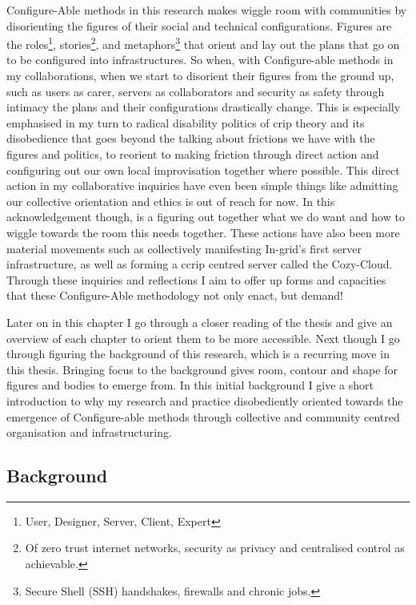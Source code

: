 Configure-Able methods in this research makes wiggle room with
communities by disorienting the figures of their social and technical
configurations. Figures are the roles\footnote{User, Designer, Server,
  Client, Expert}, stories\footnote{Of zero trust internet networks,
  security as privacy and centralised control as achievable.}, and
metaphors\footnote{Secure Shell (SSH) handshakes, firewalls and chronic
  jobs.} that orient and lay out the plans that go on to be configured
into infrastructures. So when, with Configure-able methods in my
collaborations, when we start to disorient their figures from the ground
up, such as users as carer, servers as collaborators and security as
safety through intimacy the plans and their configurations drastically
change. This is especially emphasised in my turn to radical disability
politics of crip theory and its disobedience that goes beyond the
talking about frictions we have with the figures and politics, to
reorient to making friction through direct action and configuring out
our own local improvisation together where possible. This direct action
in my collaborative inquiries have even been simple things like
admitting our collective orientation and ethics is out of reach for now.
In this acknowledgement though, is a figuring out together what we do
want and how to wiggle towards the room this needs together. These
actions have also been more material movements such as collectively
manifesting In-grid's first server infrastructure, as well as forming a
ccrip centred server called the Cozy-Cloud. Through these inquiries and
reflections I aim to offer up forms and capacities that these
Configure-Able methodology not only enact, but demand!

Later on in this chapter I go through a closer reading of the thesis and
give an overview of each chapter to orient them to be more accessible.
Next though I go through figuring the background of this research, which
is a recurring move in this thesis. Bringing focus to the background
gives room, contour and shape for figures and bodies to emerge from. In
this initial background I give a short introduction to why my research
and practice disobediently oriented towards the emergence of
Configure-able methods through collective and community centred
organisation and infrastructuring.

\hypertarget{background}{%
\subsection{Background}\label{background}}


